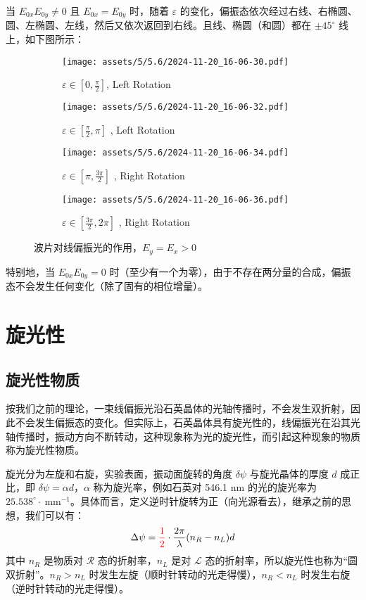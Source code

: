\documentclass[UTF8]{report}
\theoremstyle{MyLineTheoremStyle} %
\theoremstyle{MyBlockTheoremStyle} %
\theoremstyle{MySubsubsectionStyle} %
\begin{document}
当 $E_{0x}E_{0y} \ne 0$ 且 $E_{0x} = E_{0y}$ 时，随着 $\varepsilon$ 的变化，偏振态依次经过右线、右椭圆、圆、左椭圆、左线，然后又依次返回到右线。且线、椭圆（和圆）都在 $\pm 45^\circ$ 线上，如下图所示：

\begin{figure}[H]\centering
    \begin{subfigure}[b]{0.24\columnwidth}\centering
        \texttt{[image: assets/5/5.6/2024-11-20\_16-06-30.pdf]}
        \caption{$\varepsilon \in [0, \frac{\pi}{2}]$, Left Rotation}
    \end{subfigure}
    \begin{subfigure}[b]{0.24\columnwidth}\centering
        \texttt{[image: assets/5/5.6/2024-11-20\_16-06-32.pdf]}
        \caption{$\varepsilon \in [\frac{\pi}{2}, \pi]$ , Left Rotation}
    \end{subfigure}
    \begin{subfigure}[b]{0.24\columnwidth}\centering
        \texttt{[image: assets/5/5.6/2024-11-20\_16-06-34.pdf]}
        \caption{$\varepsilon \in [\pi, \frac{3\pi}{2}]$ , Right Rotation}
    \end{subfigure}
    \begin{subfigure}[b]{0.24\columnwidth}\centering
        \texttt{[image: assets/5/5.6/2024-11-20\_16-06-36.pdf]}
        \caption{$\varepsilon \in [\frac{3\pi}{2}, 2\pi]$ , Right Rotation}
    \end{subfigure}
    \caption{波片对线偏振光的作用，$E_y = E_x > 0$}
\end{figure}

特别地，当  $E_{0x}E_{0y} = 0$ 时（至少有一个为零），由于不存在两分量的合成，偏振态不会发生任何变化（除了固有的相位增量）。

\section{旋光性}
\subsection{旋光性物质}
按我们之前的理论，一束线偏振光沿石英晶体的光轴传播时，不会发生双折射，因此不会发生偏振态的变化。但实际上，石英晶体具有旋光性的，线偏振光在沿其光轴传播时，振动方向不断转动，这种现象称为光的旋光性，而引起这种现象的物质称为旋光性物质。

旋光分为左旋和右旋，实验表面，振动面旋转的角度 $\delta \psi$ 与旋光晶体的厚度 $d$ 成正比，即 $\delta \psi = \alpha d$，$\alpha$ 称为旋光率，例如石英对 546.1 nm 的光的旋光率为 $25.538^\circ \cdot \ \mathrm{mm^{-1}}$。具体而言，定义逆时针旋转为正（向光源看去），继承之前的思想，我们可以有：
\begin{equation}\label{旋光性}
\Delta \psi = {\color{red} \frac{1}{2}}\cdot  \frac{2\pi}{\lambda} (n_R - n_L) d
\end{equation}
其中 $n_R$ 是物质对 $\mathscr{R}$ 态的折射率，$n_L$ 是对 $\mathscr{L}$ 态的折射率，所以旋光性也称为“圆双折射”。$n_R >n_L$ 时发生左旋（顺时针转动的光走得慢），$n_R < n_L$ 时发生右旋（逆时针转动的光走得慢）。
\end{document}
